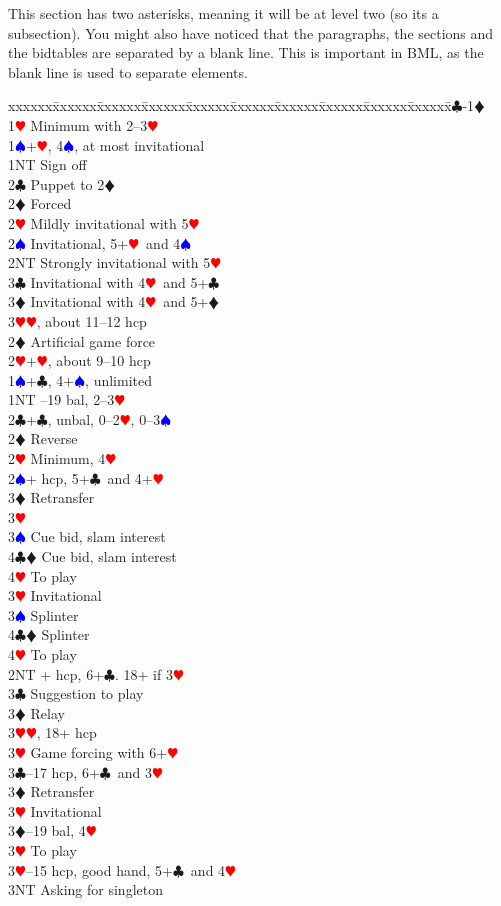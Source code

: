 \documentclass[a4paper]{article}
\newcommand{\BC}{\textcolor{OliveGreen}{$\clubsuit$}}
\newcommand{\BD}{\textcolor{RedOrange}{$\vardiamondsuit$}}
\newcommand{\BH}{\textcolor{Red}{$\varheartsuit${}}}
\newcommand{\BS}{\textcolor{Blue}{$\spadesuit${}}}
\newenvironment{bidtable}
{\begin{tabbing}

xxxxxx\=xxxxxx\=xxxxxx\=xxxxxx\=xxxxxx\=xxxxxx\=xxxxxx\=xxxxxx\=xxxxxx\=xxxxxx\=\kill}
{\end{tabbing} }%
\begin{document}
This section has two asterisks, meaning it will be at level two
(so its a subsection). You might also have noticed that the
paragraphs, the sections and the bidtables are separated by a
blank line. This is important in BML, as the blank line is used to
separate elements.
\bigbreak
\begin{bidtable}
1\BC-1\BD\+\\
1\BH \> Minimum with 2--3\BH \+\\
1\BS {}+\BH , 4\BS , at most invitational\\
1NT \> Sign off\\
2\BC \> Puppet to 2\BD \+\\
2\BD \> Forced\+\\
2\BH \> Mildly invitational with 5\BH \\
2\BS \> Invitational, 5+\BH\ and 4\BS \\
2NT \> Strongly invitational with 5\BH \\
3\BC \> Invitational with 4\BH\ and 5+\BC \\
3\BD \> Invitational with 4\BH\ and 5+\BD \\
3\BH {}\BH , about 11--12 hcp\-\-\\
2\BD \> Artificial game force\\
2\BH {}+\BH , about 9--10 hcp\-\\
1\BS {}+\BC , 4+\BS , unlimited\\
1NT --19 bal, 2--3\BH \\
2\BC {}+\BC , unbal, 0--2\BH , 0--3\BS \\
2\BD \> Reverse\\
2\BH \> Minimum, 4\BH \\
2\BS {}+ hcp, 5+\BC\ and 4+\BH \+\\
3\BD \> Retransfer\+\\
3\BH\+\\
3\BS \> Cue bid, slam interest\\
4\BC\BD \> Cue bid, slam interest\\
4\BH \> To play\-\-\\
3\BH \> Invitational\\
3\BS \> Splinter\\
4\BC\BD \> Splinter\\
4\BH \> To play\-\\
2NT + hcp, 6+\BC . 18+ if 3\BH \+\\
3\BC \> Suggestion to play\\
3\BD \> Relay\+\\
3\BH {}\BH , 18+ hcp\-\\
3\BH \> Game forcing with 6+\BH \-\\
3\BC {}--17 hcp, 6+\BC\ and 3\BH \+\\
3\BD \> Retransfer\\
3\BH \> Invitational\-\\
3\BD {}--19 bal, 4\BH \+\\
3\BH \> To play\-\\
3\BH {}--15 hcp, good hand, 5+\BC\ and 4\BH \+\\
3NT \> Asking for singleton\-\-
\end{bidtable}
\end{document}
